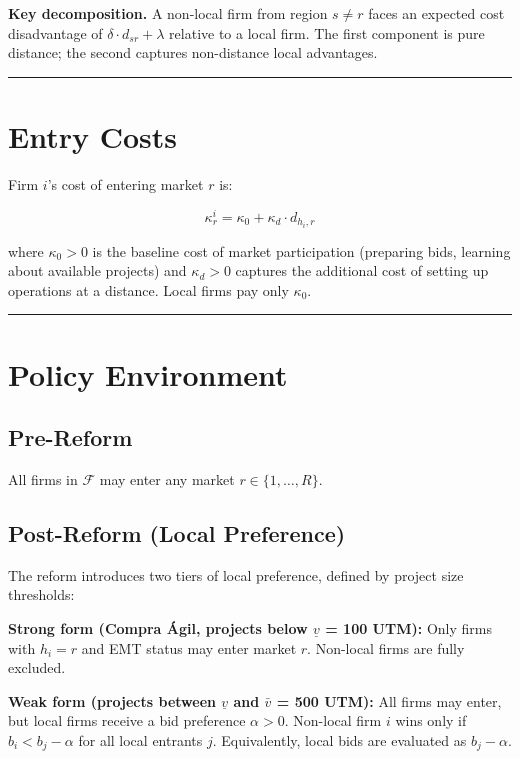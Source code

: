 \documentclass[10pt]{article}
\begin{document}
\noindent\textbf{Key decomposition.} A non-local firm from region $s \neq r$ faces an expected cost disadvantage of $\delta \cdot d_{sr} + \lambda$ relative to a local firm. The first component is pure distance; the second captures non-distance local advantages.

\bigskip\hrule\bigskip

\section{Entry Costs}

Firm $i$'s cost of entering market $r$ is:

\[
  \kappa_r^i = \kappa_0 + \kappa_d \cdot d_{h_i, r}
\]

where $\kappa_0 > 0$ is the baseline cost of market participation (preparing bids, learning about available projects) and $\kappa_d > 0$ captures the additional cost of setting up operations at a distance. Local firms pay only $\kappa_0$.

\bigskip\hrule\bigskip

\section{Policy Environment}

\subsection*{Pre-Reform}

All firms in $\mathcal{F}$ may enter any market $r \in \{1, \dots, R\}$.

\subsection*{Post-Reform (Local Preference)}

The reform introduces two tiers of local preference, defined by project size thresholds:

\medskip
\noindent\textbf{Strong form (Compra \'{A}gil, projects below $\underline{v}$ = 100 UTM):} Only firms with $h_i = r$ and EMT status may enter market $r$. Non-local firms are fully excluded.

\medskip
\noindent\textbf{Weak form (projects between $\underline{v}$ and $\bar{v}$ = 500 UTM):} All firms may enter, but local firms receive a bid preference $\alpha > 0$. Non-local firm $i$ wins only if $b_i < b_j - \alpha$ for all local entrants $j$. Equivalently, local bids are evaluated as $b_j - \alpha$.
\end{document}
